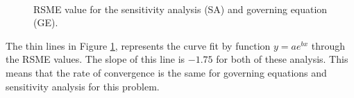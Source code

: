 \begin{figure}[H]
    \centering
    \\
    \caption{RSME value for the sensitivity analysis (SA) and governing equation (GE).}
    \label{fig:C4_effectOfRHfunctionOnSimulationResults1Dproblem}
\end{figure}


The thin lines in Figure \ref{fig:C4_effectOfRHfunctionOnSimulationResults1Dproblem}, represents the curve fit by function $y = ae^{bx}$ through the RSME values. The slope of this line is $-1.75$ for both of these analysis. This means that the rate of convergence is the same for governing equations and sensitivity analysis for this problem.